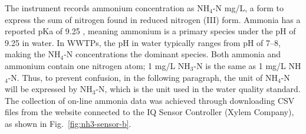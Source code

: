 The instrument records ammonium concentration as NH$_{4}$-N mg/L, a form to express the sum of nitrogen found in reduced nitrogen (III) form. Ammonia has a reported pKa of 9.25 \citep{nationalcenterforbiotechnologyinformationPubChemCompoundSummary2022}, meaning ammonium is a primary species under the pH of 9.25 in water. In WWTPs, the pH in water typically ranges from pH of 7--8, making the NH$_{4}$-N concentrations the dominant species. Both ammonia and ammonium contain one nitrogen atom; 1 mg/L NH$_{3}$-N is the same as 1 mg/L NH$_{4}$-N. Thus, to prevent confusion, in the following paragraph, the unit of NH$_{4}$-N will be expressed by NH$_{3}$-N, which is the unit used in the water quality standard. The collection of on-line ammonia data was achieved through downloading CSV files from the website connected to the IQ Sensor Controller (Xylem Company), as shown in Fig.~\ref{fig:nh3-sensor-b}. 

